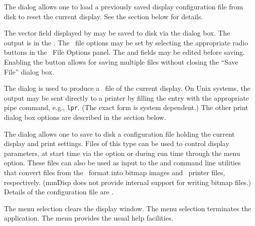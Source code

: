 The  dialog
allows one to load a previously saved display configuration file from
disk to reset the current display. See the  section below for details.

The vector field displayed by  may be saved to disk via the
{} dialog box.  The output
is in the .  The \OVF\ file
options may be set by selecting the appropriate radio buttons in the
\OVF\ File Options panel.  The  and  fields may be
edited before saving.  Enabling the  button allows for
saving multiple files without closing the ``Save File'' dialog box.

The  dialog is used to
produce a \postscript\ file of the current display.  On Unix systems, the
output may be sent directly to a
printer by filling the
 entry with the appropriate pipe command, e.g.,
\pipe\texttt{lpr}.  (The exact form is system dependent.)  The other
print dialog box options are described in the
 section below.

The  dialog
allows one to save to disk a configuration file holding the current
display and print settings.  Files of this type can be used to control display
parameters, at start time via the  option or during run time
through the  menu option. These files
can also be used as input to the  and
 command line utilities
that convert files from the \OVF\ format into bitmap images and
\postscript\ printer files, respectively.  (mmDisp does not provide
internal support for writing bitmap files.)  Details of the configuration
file are .

\label{sec:mmdispcontrols}

The menu selection  clears the display window.
The menu selection  terminates the
 application.  The menu  provides
the usual help facilities.

